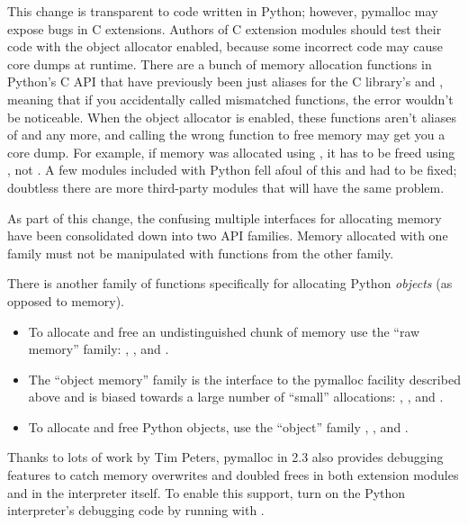 \documentclass{howto}
\begin{document}
This change is transparent to code written in Python; however,
pymalloc may expose bugs in C extensions.  Authors of C extension
modules should test their code with the object allocator enabled,
because some incorrect code may cause core dumps at runtime.  There
are a bunch of memory allocation functions in Python's C API that have
previously been just aliases for the C library's 
and , meaning that if you accidentally called
mismatched functions, the error wouldn't be noticeable.  When the
object allocator is enabled, these functions aren't aliases of
 and  any more, and calling the
wrong function to free memory may get you a core dump.  For example,
if memory was allocated using , it has to
be freed using , not .  A
few modules included with Python fell afoul of this and had to be
fixed; doubtless there are more third-party modules that will have the
same problem.

As part of this change, the confusing multiple interfaces for
allocating memory have been consolidated down into two API families.
Memory allocated with one family must not be manipulated with
functions from the other family.

There is another family of functions specifically for allocating
Python \emph{objects} (as opposed to memory).

\begin{itemize}
  \item To allocate and free an undistinguished chunk of memory use
  the ``raw memory'' family: ,
  , and .

  \item The ``object memory'' family is the interface to the pymalloc
  facility described above and is biased towards a large number of
  ``small'' allocations: ,
  , and .

  \item To allocate and free Python objects, use the ``object'' family
  , , and
  .
\end{itemize}

Thanks to lots of work by Tim Peters, pymalloc in 2.3 also provides
debugging features to catch memory overwrites and doubled frees in
both extension modules and in the interpreter itself.  To enable this
support, turn on the Python interpreter's debugging code by running
 with .  
\end{document}
